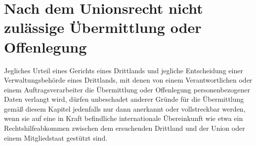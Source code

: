\chapter{Nach dem Unionsrecht nicht zulässige Übermittlung oder Offenlegung}
\label{ch:48}


Jegliches Urteil eines Gerichts eines Drittlands und jegliche Entscheidung einer Verwaltungsbehörde eines Drittlands,
mit denen von einem Verantwortlichen oder einem Auftragsverarbeiter die Übermittlung oder Offenlegung personenbezogener
Daten verlangt wird, dürfen unbeschadet anderer Gründe für die Übermittlung gemäß diesem Kapitel jedenfalls nur dann
anerkannt oder vollstreckbar werden, wenn sie auf eine in Kraft befindliche internationale Übereinkunft wie etwa ein
Rechtshilfeabkommen zwischen dem ersuchenden Drittland und der Union oder einem Mitgliedstaat gestützt sind.


